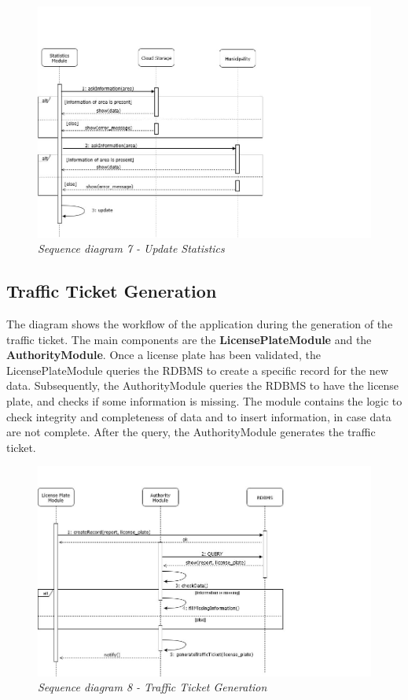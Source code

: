 \begin{figure}[H]
  \centering
  \includegraphics[width=\textwidth]{DD_Images/RuntimeView/7.jpg}
  \caption{\textit{Sequence diagram 7 - Update Statistics}}
\end{figure}

\subsection{Traffic Ticket Generation}
The diagram shows the workflow of the application during the generation of the traffic ticket. The main components are the 
\textbf{LicensePlateModule} and the \textbf{AuthorityModule}. Once a license plate has been validated, the LicensePlateModule queries the 
RDBMS to create a specific record for the new data. Subsequently, the AuthorityModule queries the RDBMS to have the license plate, and checks
if some information is missing. The module contains the logic to check integrity and completeness of data and to insert information, in case data 
are not complete. After the query, the AuthorityModule generates the traffic ticket.

\begin{figure}[H]
  \centering
  \includegraphics[width=\textwidth]{DD_Images/RuntimeView/8.jpg}
  \caption{\textit{Sequence diagram 8 - Traffic Ticket Generation}}
\end{figure}

